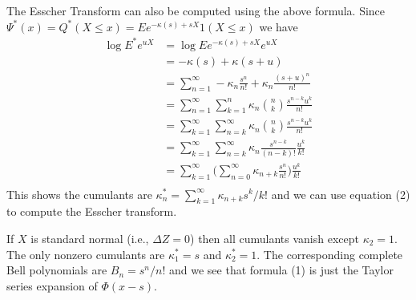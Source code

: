 \documentclass[11pt]{article}
\theoremstyle{definition}
\begin{document}
The Esscher Transform can also be computed using the above formula.
Since
\(\Psi^*(x) = Q^*(X\le x) = Ee^{-\kappa(s) + sX}1(X\le x)\)
we have
\begin{align*}
\log E^* e^{uX} &= \log E e^{-\kappa(s) + s X} e^{uX}\\
&= -\kappa(s) + \kappa(s + u)\\
&= \sum_{n=1}^\infty -\kappa_n \frac{s^n}{n!} 
	+ \kappa_n \frac{(s + u)^n}{n!}\\
&= \sum_{n=1}^\infty \sum_{k=1}^{n} \kappa_n \binom{n}{k}
	\frac{s^{n - k}u^k}{n!}\\
&= \sum_{k=1}^\infty \sum_{n=k}^\infty \kappa_n 
	\binom{n}{k}\frac{s^{n - k}u^k}{n!}\\
&= \sum_{k=1}^\infty \sum_{n=k}^\infty \kappa_n \frac{s^{n-k}}{(n-k)!}
	\frac{u^k}{k!}\\
&= \sum_{k=1}^\infty 
	\bigl(\sum_{n=0}^\infty \kappa_{n+k} \frac{s^n}{n!}\bigr)
	\frac{u^k}{k!}\\
\end{align*}
This shows the cumulants are 
\(\kappa^*_n = \sum_{k=1}^\infty \kappa_{n + k}s^k/k!\)
and we can use equation (2) to compute the Esscher transform.

If \(X\) is standard normal (i.e., \(\Delta Z = 0\)) then all cumulants vanish except \(\kappa_2 = 1\).
The only nonzero cumulants are \(\kappa^*_1 = s\)
and \(\kappa^*_2 = 1\). The corresponding complete Bell polynomials
are \(B_n = s^n/n!\) and we see that formula (1) is just
the Taylor series expansion of \(\Phi(x - s)\).
%
%
\end{document}
